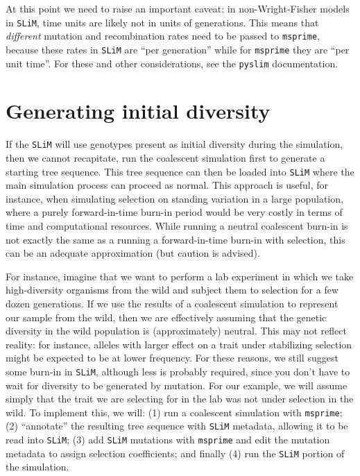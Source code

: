 \documentclass[12pt]{article}
\newcommand{\msprime}[0]{\texttt{msprime}\xspace}
\newcommand{\slim}[0]{\texttt{SLiM}\xspace}
\newcommand{\pyslim}[0]{\texttt{pyslim}\xspace}
\begin{document}
At this point we need to raise an important caveat:
in non-Wright-Fisher models in \slim,
time units are likely not in units of generations.
This means that \emph{different} mutation and recombination rates need to be passed to \msprime,
because these rates in \slim are ``per generation'' while for \msprime they are ``per unit time''.
For these and other considerations, see the \pyslim documentation.

\section{Generating initial diversity} %

If the \slim will use genotypes present as initial diversity during the simulation,
then we cannot recapitate,
run the coalescent simulation first to generate a starting tree sequence.
This tree sequence can then be loaded into \slim where the main simulation process can proceed as normal.
This approach is useful, for instance, when simulating selection on standing variation in a large population,
where a purely forward-in-time burn-in period would be very costly in terms of time and computational resources.
While running a neutral coalescent burn-in is not exactly the same as a running a forward-in-time burn-in with selection,
this can be an adequate approximation (but caution is advised).

For instance,
imagine that we want to perform a lab experiment in which we take high-diversity
organisms from the wild and subject them to selection for a few dozen generations.
If we use the results of a coalescent simulation to represent our sample from the wild,
then we are effectively assuming that the genetic diversity in the wild population is (approximately) neutral.
This may not reflect reality: for instance,
alleles with larger effect on a trait under stabilizing selection might be expected to be at lower frequency.
For these reasons, we still suggest some burn-in in \slim,
although less is probably required, since you don't have to wait for diversity to be generated by mutation.
For our example, we will assume simply that the trait we are selecting for in the lab was
not under selection in the wild. To implement this, we will:
(1) run a coalescent simulation with \msprime;
(2) ``annotate'' the resulting tree sequence with \slim metadata, allowing it to be read into \slim;
(3) add \slim mutations with \msprime
        and edit the mutation metadata to assign selection coefficients; and finally
(4) run the \slim portion of the simulation.
\end{document}
